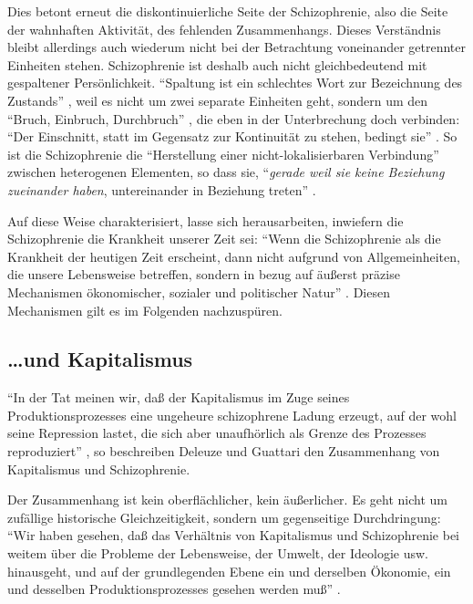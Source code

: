 \documentclass[12pt,
               DIV13,
               paper=a4,
               twoside=false,
               onehalfspacing,
               bibliography=totoc,
               toc=graduated,
               draft,
               ]{scrartcl}
\newcommand{\pc}[2]{\parencite[#1]{#2}}
\begin{document}
Dies betont erneut die diskontinuierliche Seite der Schizophrenie,
also die Seite der wahnhaften Aktivität, des fehlenden Zusammenhangs.
Dieses Verständnis bleibt allerdings auch wiederum nicht bei der
Betrachtung voneinander getrennter Einheiten stehen. Schizophrenie ist
deshalb auch nicht gleichbedeutend mit gespaltener Persönlichkeit.
"`Spaltung ist ein schlechtes Wort zur Bezeichnung des Zustands"'
\pc{27}{schizg}, weil es nicht um zwei separate Einheiten geht,
sondern um den "`Bruch, Einbruch, Durchbruch"' \pc{28}{schizg}, die
eben in der Unterbrechung doch verbinden: "`Der Einschnitt, statt im
Gegensatz zur Kontinuität zu stehen, bedingt sie"' \pc{47}{ao}. So ist
die Schizophrenie die "`Herstellung einer nicht-lokalisierbaren
Verbindung"' \pc{19}{schizg} zwischen heterogenen Elementen, so dass
sie, "`\emph{gerade weil sie keine Beziehung zueinander haben},
untereinander in Beziehung treten"' \pc{S. 19, Hervorh. im
Orig.}{schizg}.

Auf diese Weise charakterisiert, lasse sich herausarbeiten, inwiefern
die Schizophrenie die Krankheit unserer Zeit sei: "`Wenn die
Schizophrenie als die Krankheit der heutigen Zeit erscheint, dann
nicht aufgrund von Allgemeinheiten, die unsere Lebensweise betreffen,
sondern in bezug auf äußerst präzise Mechanismen ökonomischer,
sozialer und politischer Natur"' \pc{28}{schizg}. Diesen Mechanismen
gilt es im Folgenden nachzuspüren.



\subsection{\dots und Kapitalismus}

"`In der Tat meinen wir, daß der Kapitalismus im Zuge seines
Produktionsprozesses eine ungeheure schizophrene Ladung erzeugt, auf
der wohl seine Repression lastet, die sich aber unaufhörlich als
Grenze des Prozesses reproduziert"' \pc{45}{ao}, so beschreiben
Deleuze und Guattari den Zusammenhang von Kapitalismus und
Schizophrenie.

Der Zusammenhang ist kein oberflächlicher, kein äußerlicher. Es geht
nicht um zufällige historische Gleichzeitigkeit, sondern um
gegenseitige Durchdringung: "`Wir haben gesehen, daß das Verhältnis
von Kapitalismus und Schizophrenie bei weitem über die Probleme der
Lebensweise, der Umwelt, der Ideologie usw. hinausgeht, und auf der
grundlegenden Ebene ein und derselben Ökonomie, ein und desselben
Produktionsprozesses gesehen werden muß"' \pc{315}{ao}.
\end{document}
